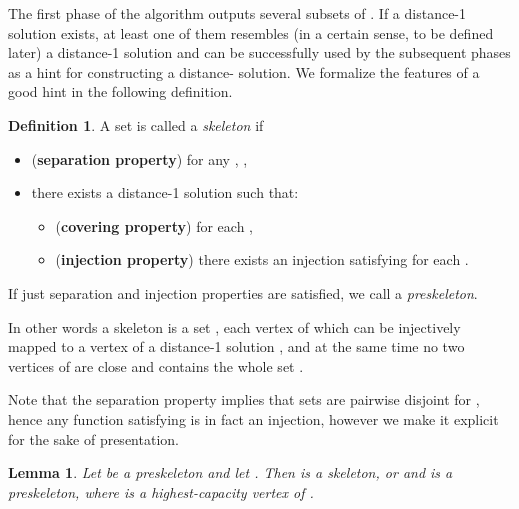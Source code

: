 \documentclass{article}
\theoremstyle{plain}
\newtheorem{lemma}[theorem]{Lemma}
\theoremstyle{definition}
\newtheorem{definition}[theorem]{Definition}
\begin{document}
The first phase of the algorithm outputs several subsets of .
If a distance-1 solution exists, at least one of them resembles (in a certain
sense, to be defined later) a distance-1 solution and can be successfully used
by the subsequent phases as a hint for constructing a distance- solution. 
We formalize the features of a good hint in the following definition.
\begin{definition}
A set  is called a \emph{skeleton} if
\begin{itemize}
  \item ({\bf separation property})  for any , ,
  \item there exists a distance-1 solution  such that:
  \begin{itemize}
    \item ({\bf covering property})  for each ,
    \item ({\bf injection property}) there exists an injection  
    satisfying  for each .
  \end{itemize}
\end{itemize}
If just separation and injection properties are satisfied, we call  a \emph{preskeleton}.
\end{definition}

In other words a skeleton is a set , each vertex of which
can be injectively mapped to a vertex of a distance-1 solution ,
and at the same time no two vertices of  are close
and  contains the whole set .

Note that the separation property implies that sets  are pairwise disjoint for
, hence any function  satisfying  
is in fact an injection, however we make it explicit for the sake of presentation.

\begin{lemma}\label{lem:ind}
Let  be a preskeleton and let .
Then  is a skeleton, or  and  is a preskeleton,
where  is a highest-capacity vertex of .
\end{lemma}
\end{document}
